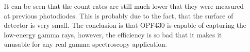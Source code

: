 It can be seen that the count rates are still much lower that they were measured at previous photodiodes. This is probably due to the fact, that the surface of detector is very small.
The conclusion is that OPF430 is capable of capturing the low-energy gamma rays, however, the efficiency is so bad that it makes it unusable for any real gamma spectroscopy application. 
